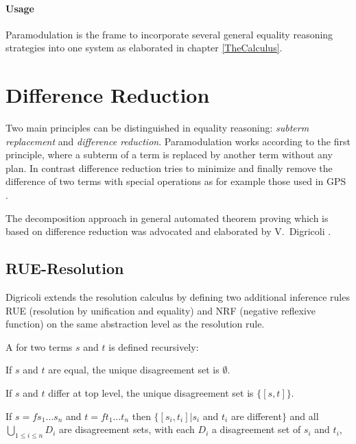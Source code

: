 \paragraph{Usage}

Paramodulation is the frame to incorporate several general equality reasoning 
strategies into one system as elaborated in chapter \ref{TheCalculus}.


\section{Difference Reduction}
\label{DifferenceReduction}

Two main principles can be distinguished in equality reasoning: {\em
subterm replacement} and {\em difference reduction}.
\label{ReplacementDifference} Paramodulation works
according to the first principle, where a subterm of a term is replaced by
another term without any plan. In contrast difference reduction tries to
minimize and finally remove the difference of two terms with special
operations as for example those used in GPS \cite{NeShSi59}.

The decomposition approach 
in general automated theorem proving
which is based on difference reduction
was advocated and elaborated by V.\ Digricoli \cite{Digricoli79}.

\subsection{RUE-Resolution}

Digricoli extends the resolution calculus by defining
two additional inference rules RUE (resolution by unification and equality) 
and NRF (negative reflexive function) on the same
abstraction level as the resolution rule.

\begin{Def}

\label{DisagreementSet}
\return
A  for two terms
$s$ and $t$ is defined recursively:

If $s$ and $t$ are equal, the unique disagreement set
is $\emptyset$.

If $s$ and $t$ differ at top level, the unique disagreement
set is $\{[s,t]\}$.

If $s=fs_1\ldots s_n$ and $t=ft_1\ldots t_n$ then
$\{[s_i,t_i] | s_i$ and $t_i$ are different$\}$ and
all $\bigcup_{1\leq i\leq n}D_i$ are disagreement sets,
with each $D_i$ a disagreement set of $s_i$ and $t_i$,
\end{Def}

